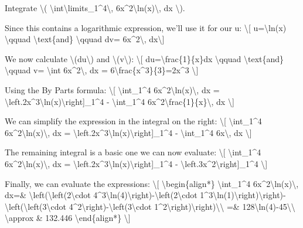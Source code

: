 Integrate \textbackslash{}(
\textbackslash{}int\textbackslash{}limits\_1\^{}4\textbackslash{},
6x\^{}2\textbackslash{}ln(x)\textbackslash{}, dx \textbackslash{}).

Since this contains a logarithmic expression, we'll use it for our u:
\textbackslash{}{[} u=\textbackslash{}ln(x) \textbackslash{}qquad
\textbackslash{}text\{and\} \textbackslash{}qquad dv=
6x\^{}2\textbackslash{}, dx\textbackslash{}{]}

We now calculate \textbackslash{}(du\textbackslash{}) and
\textbackslash{}(v\textbackslash{}): \textbackslash{}{[}
du=\textbackslash{}frac\{1\}\{x\}dx \textbackslash{}qquad
\textbackslash{}text\{and\} \textbackslash{}qquad v= \textbackslash{}int
6x\^{}2\textbackslash{}, dx =
6\textbackslash{}frac\{x\^{}3\}\{3\}=2x\^{}3 \textbackslash{}{]}

Using the By Parts formula: \textbackslash{}{[}
\textbackslash{}int\_1\^{}4
6x\^{}2\textbackslash{}ln(x)\textbackslash{}, dx =
\textbackslash{}left.2x\^{}3\textbackslash{}ln(x)\textbackslash{}right{]}\_1\^{}4
- \textbackslash{}int\_1\^{}4
6x\^{}2\textbackslash{}frac\{1\}\{x\}\textbackslash{}, dx
\textbackslash{}{]}

We can simplify the expression in the integral on the right:
\textbackslash{}{[} \textbackslash{}int\_1\^{}4
6x\^{}2\textbackslash{}ln(x)\textbackslash{}, dx =
\textbackslash{}left.2x\^{}3\textbackslash{}ln(x)\textbackslash{}right{]}\_1\^{}4
- \textbackslash{}int\_1\^{}4 6x\textbackslash{}, dx \textbackslash{}{]}

The remaining integral is a basic one we can now evaluate:
\textbackslash{}{[} \textbackslash{}int\_1\^{}4
6x\^{}2\textbackslash{}ln(x)\textbackslash{}, dx =
\textbackslash{}left.2x\^{}3\textbackslash{}ln(x)\textbackslash{}right{]}\_1\^{}4
- \textbackslash{}left.3x\^{}2\textbackslash{}right{]}\_1\^{}4
\textbackslash{}{]}

Finally, we can evaluate the expressions: \textbackslash{}{[}
\textbackslash{}begin\{align*\} \textbackslash{}int\_1\^{}4
6x\^{}2\textbackslash{}ln(x)\textbackslash{}, dx=\&
\textbackslash{}left(\textbackslash{}left(2\textbackslash{}cdot
4\^{}3\textbackslash{}ln(4)\textbackslash{}right)-\textbackslash{}left(2\textbackslash{}cdot
1\^{}3\textbackslash{}ln(1)\textbackslash{}right)\textbackslash{}right)-\textbackslash{}left(\textbackslash{}left(3\textbackslash{}cdot
4\^{}2\textbackslash{}right)-\textbackslash{}left(3\textbackslash{}cdot
1\^{}2\textbackslash{}right)\textbackslash{}right)\textbackslash{}\textbackslash{}
=\& 128\textbackslash{}ln(4)-45\textbackslash{}\textbackslash{}
\textbackslash{}approx \& 132.446 \textbackslash{}end\{align*\}
\textbackslash{}{]}


